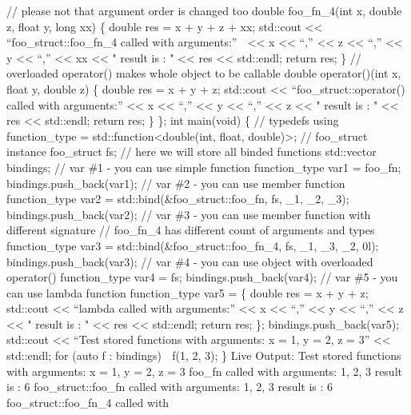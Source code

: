 // please not that argument order is changed too double foo\_fn\_4(int
x, double z, float y, long xx) \{ double res = x + y + z + xx; std::cout
\textless\textless{} ``foo\_struct::foo\_fn\_4 called with arguments:''
 \textless\textless{} x \textless\textless{} ``,'' \textless\textless{}
z \textless\textless{} ``,'' \textless\textless{} y \textless\textless{}
``,'' \textless\textless{} xx \textless\textless{} " result is : "
\textless\textless{} res \textless\textless{} std::endl; return res; \}
// overloaded operator() makes whole object to be callable double
operator()(int x, float y, double z) \{ double res = x + y + z;
std::cout \textless\textless{} ``foo\_struct::operator() called with
arguments:'' \textless\textless{} x \textless\textless{} ``,''
\textless\textless{} y \textless\textless{} ``,'' \textless\textless{} z
\textless\textless{} " result is : " \textless\textless{} res
\textless\textless{} std::endl; return res; \} \}; int main(void) \{ //
typedefs using function\_type = std::function\textless double(int,
float, double)\textgreater; // foo\_struct instance foo\_struct fs; //
here we will store all binded functions std::vector bindings; // var \#1
- you can use simple function function\_type var1 = foo\_fn;
bindings.push\_back(var1); // var \#2 - you can use member function
function\_type var2 = std::bind(\&foo\_struct::foo\_fn, fs, \_1, \_2,
\_3); bindings.push\_back(var2); // var \#3 - you can use member
function with different signature // foo\_fn\_4 has different count of
arguments and types function\_type var3 =
std::bind(\&foo\_struct::foo\_fn\_4, fs, \_1, \_3, \_2, 0l);
bindings.push\_back(var3); // var \#4 - you can use object with
overloaded operator() function\_type var4 = fs;
bindings.push\_back(var4); // var \#5 - you can use lambda function
function\_type var5 = \href{int\%20x,\%20float\%20y,\%20double\%20z}{}
\{ double res = x + y + z; std::cout \textless\textless{} ``lambda
called with arguments:'' \textless\textless{} x \textless\textless{}
``,'' \textless\textless{} y \textless\textless{} ``,''
\textless\textless{} z \textless\textless{} " result is : "
\textless\textless{} res \textless\textless{} std::endl; return res; \};
bindings.push\_back(var5); std::cout \textless\textless{} ``Test stored
functions with arguments: x = 1, y = 2, z = 3'' \textless\textless{}
std::endl; for (auto f : bindings)  f(1, 2, 3); \} Live Output: Test
stored functions with arguments: x = 1, y = 2, z = 3 foo\_fn called with
arguments: 1, 2, 3 result is : 6 foo\_struct::foo\_fn called with
arguments: 1, 2, 3 result is : 6 foo\_struct::foo\_fn\_4 called with
